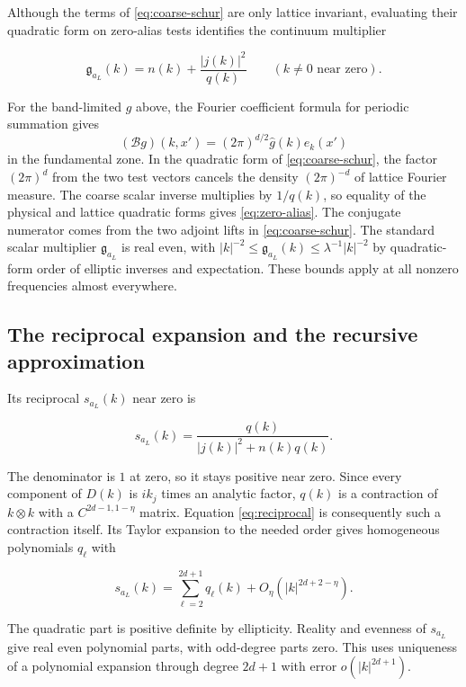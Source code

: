 \documentclass[11pt]{article}
\begin{document}
Although the terms of \eqref{eq:coarse-schur} are only lattice invariant, evaluating their quadratic form on zero-alias tests identifies the continuum multiplier

\begin{equation}\label{eq:zero-alias}
\mathfrak g_{a_L}(k)= n(k)+\frac{|j(k)|^2}{q(k)}
\qquad(k\ne0\text{ near zero}).
\end{equation}

For the band-limited \(g\) above, the Fourier coefficient formula for periodic summation gives
\[
    (\mathcal B g)(k,x')=(2\pi)^{d/2}\widehat g(k)e_k(x')
\]
in the fundamental zone. In the quadratic form of \eqref{eq:coarse-schur}, the factor \((2\pi)^d\) from the two test vectors cancels the density \((2\pi)^{-d}\) of lattice Fourier measure. The coarse scalar inverse multiplies by \(1/q(k)\), so equality of the physical and lattice quadratic forms gives \eqref{eq:zero-alias}. The conjugate numerator comes from the two adjoint lifts in \eqref{eq:coarse-schur}. The standard scalar multiplier \(\mathfrak g_{a_L}\) is real even, with \(|k|^{-2}\le\mathfrak g_{a_L}(k)\le\lambda^{-1}|k|^{-2}\) by quadratic-form order of elliptic inverses and expectation. These bounds apply at all nonzero frequencies almost everywhere.

\subsection{The reciprocal expansion and the recursive approximation}\label{subsec:lift}

Its reciprocal \(s_{a_L}(k)\) near zero is

\begin{equation}\label{eq:reciprocal}
s_{a_L}(k)=\frac{q(k)}{|j(k)|^2+n(k)q(k)} .
\end{equation}

The denominator is \(1\) at zero, so it stays positive near zero. Since every component of \(D(k)\) is \(i k_j\) times an analytic factor, \(q(k)\) is a contraction of \(k\otimes k\) with a \(C^{2d-1,1-\eta}\) matrix. Equation \eqref{eq:reciprocal} is consequently such a contraction itself. Its Taylor expansion to the needed order gives homogeneous polynomials \(q_\ell\) with

\begin{equation}\label{eq:jets}
s_{a_L}(k)=\sum_{\ell=2}^{2d+1}q_\ell(k)+O_\eta(|k|^{2d+2-\eta}).
\end{equation}

The quadratic part is positive definite by ellipticity. Reality and evenness of \(s_{a_L}\) give real even polynomial parts, with odd-degree parts zero. This uses uniqueness of a polynomial expansion through degree \(2d+1\) with error \(o(|k|^{2d+1})\).
\end{document}
